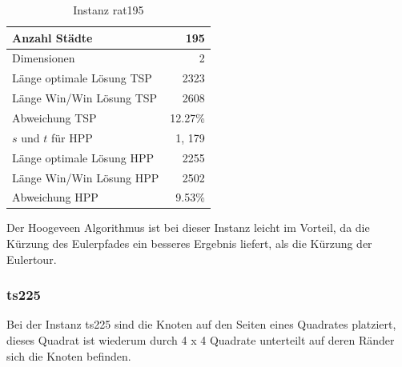 \documentclass[11pt,a4paper]{article}
\begin{document}
        \begin{table}[H]
                \centering
                \begin{tabular}{| l | r |}
                    \hline
                        Anzahl Städte               & 195           \\ \hline
                        Dimensionen                 & 2             \\ \hline
                        Länge optimale Lösung TSP   & 2323          \\ \hline
                        Länge Win/Win Lösung  TSP   & 2608          \\ \hline
                        Abweichung TSP              & 12.27\%       \\ \hline
                        $s$ und $t$ für HPP         & 1, 179        \\ \hline
                        Länge optimale Lösung HPP   & 2255          \\ \hline
                        Länge Win/Win Lösung  HPP   & 2502          \\ \hline
                        Abweichung HPP              & 9.53\%        \\ \hline
                \end{tabular}
                \caption{Instanz rat195}
                \label{tab:rat195}
        \end{table}

Der Hoogeveen Algorithmus ist bei dieser Instanz leicht im Vorteil, da die Kürzung des Eulerpfades ein besseres Ergebnis liefert, als die Kürzung der Eulertour.

\subsubsection{ts225}
Bei der Instanz ts225 sind die Knoten auf den Seiten eines Quadrates platziert, dieses Quadrat ist wiederum durch 4 x 4 Quadrate unterteilt auf deren Ränder sich die Knoten befinden.
\end{document}
